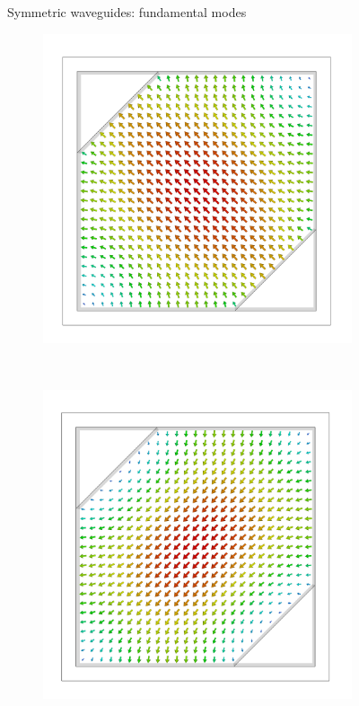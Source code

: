 \documentclass[14pt,a4paper]{ntust_report}
\begin{document}
\begin{figure}
\begin{subfigure}{.45\textwidth}
        \caption{\label{fig:circular-waveguide-mode2}}
    \end{subfigure}
    \caption{\label{fig:symmetric-waveguide-modes}Symmetric waveguides: fundamental modes}
\end{figure}

\begin{figure}
    \centering
    \begin{subfigure}{.45\textwidth}
        \centering
        \includegraphics[width=\textwidth]{src/polarizer_square_mode1.png}
        \caption{\label{fig:square-polarizer-mode1}}
    \end{subfigure}
    ~
    \begin{subfigure}{.45\textwidth}
        \centering
        \includegraphics[width=\textwidth]{src/polarizer_square_mode2.png}

\end{subfigure}
\end{figure}
\end{document}
